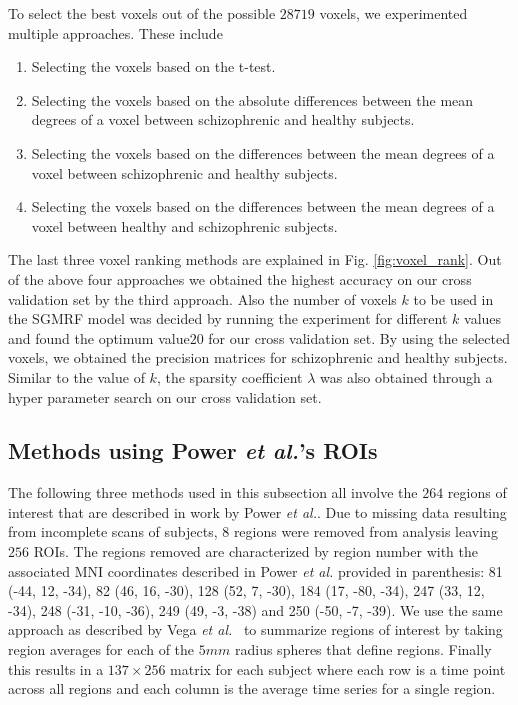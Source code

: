 \documentclass{article} %
\begin{document}
To select the best voxels out of the possible $28719$ voxels, we experimented multiple approaches. These include \begin{enumerate}
  \item Selecting the voxels based on the t-test.
  \item Selecting the voxels based on the absolute differences between the mean degrees of a voxel between schizophrenic and healthy subjects.
  \item Selecting the voxels based on the differences between the mean degrees of a voxel between schizophrenic and healthy subjects.
  \item Selecting the voxels based on the differences between the mean degrees of a voxel between healthy and schizophrenic subjects.
\end{enumerate}
The last three voxel ranking methods are explained in Fig. \ref{fig:voxel_rank}. Out of the above four approaches we obtained the highest accuracy on our cross validation set by the third approach. Also the number of voxels $k$ to be used in the SGMRF model was decided by running the experiment for different $k$ values and found the optimum value$20$ for our cross validation set. By using the selected voxels, we obtained the precision matrices for schizophrenic and healthy subjects. Similar to the value of $k$, the sparsity coefficient $\lambda$ was also obtained through a hyper parameter search on our cross validation set.

\subsection{Methods using Power \emph{et al.}'s ROIs}

The following three methods used in this subsection all involve the $264$  
regions of interest that are described in work by Power \emph{et al.}.
Due to missing data resulting from incomplete scans of subjects, $8$
regions were removed from analysis leaving $256$ ROIs. The regions removed
are characterized by region number with the associated MNI coordinates 
described in Power \emph{et al.} provided in parenthesis: 81 (-44, 12, -34), 
82 (46, 16, -30), 128 (52, 7, -30), 184 (17, -80, -34), 247 (33, 12, -34), 
248 (-31, -10, -36), 249 (49, -3, -38) and 250 (-50, -7, -39). We use the
same approach as described by Vega \emph{et al.}~\cite{rvega} to summarize
regions of interest by taking region averages for each of the $5mm$ radius
spheres that define regions. Finally this results in a $137 \times 256$ matrix
for each subject where each row is a time point across all regions and each
column is the average time series for a single region.
\end{document}

